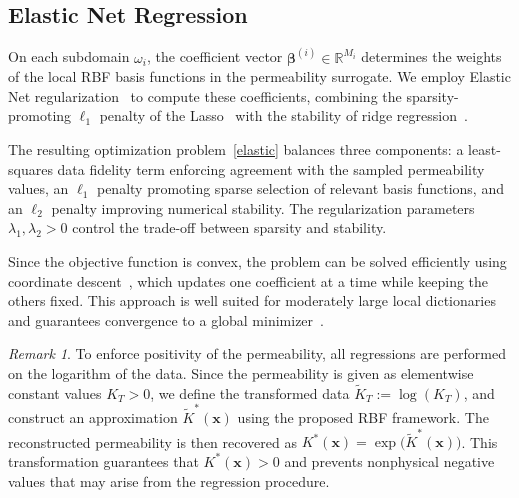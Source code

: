 \documentclass[final,1p,times]{elsarticle}
\theoremstyle{plain}
\theoremstyle{definition}
\theoremstyle{remark}
\newtheorem{remark}{Remark}          %
\newcommand{\bx}{\mathbf{x}}
\begin{document}
\subsection{Elastic Net Regression}
\label{sec:elastic_net}

On each subdomain $\omega_i$, the coefficient vector $\boldsymbol{\beta}^{(i)} \in \mathbb{R}^{M_i}$ determines the weights of the local RBF basis functions in the permeability surrogate. We employ Elastic Net regularization~\cite{zou2005elastic} to compute these coefficients, combining the sparsity-promoting $\ell_1$ penalty of the Lasso~\cite{tibshirani1996lasso} with the stability of ridge regression~\cite{hoerl1970ridge}.

The resulting optimization problem~\eqref{elastic} balances three components: a least-squares data fidelity term enforcing agreement with the sampled permeability values, an $\ell_1$ penalty promoting sparse selection of relevant basis functions, and an $\ell_2$ penalty improving numerical stability. The regularization parameters $\lambda_1,\lambda_2>0$ control the trade-off between sparsity and stability.

Since the objective function is convex, the problem can be solved efficiently using coordinate descent~\cite{friedman2010regularization}, which updates one coefficient at a time while keeping the others fixed. This approach is well suited for moderately large local dictionaries and guarantees convergence to a global minimizer~\cite{friedman2010regularization, wright2015coordinate}.
 

\begin{remark}
\label{rem:logK}
To enforce positivity of the permeability, all regressions are performed on the logarithm of the data. Since the permeability is given as elementwise constant values $K_T>0$, we define the transformed data $\widetilde{K}_T := \log(K_T)$,
and construct an approximation $\widetilde{K}^*(\bx)$ using the proposed RBF framework. The reconstructed permeability is then recovered as
$K^*(\bx) = \exp\!\big(\widetilde{K}^*(\bx)\big)$.
This transformation guarantees that $K^*(\bx)>0$ and prevents nonphysical negative values that may arise from the regression procedure.
\end{remark}
 

\end{document}
